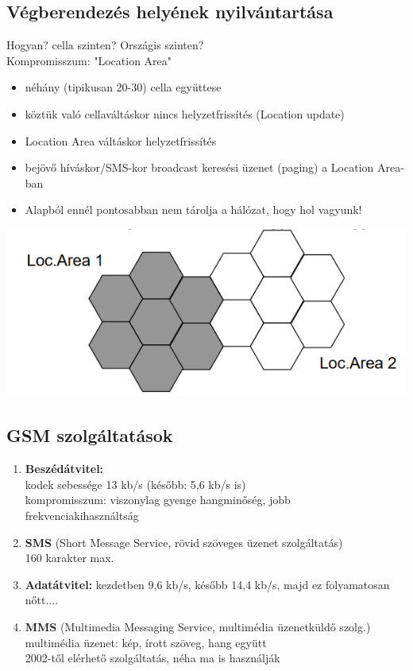 \documentclass[10pt,a4paper]{article}
\begin{document}
\subsection{Végberendezés helyének nyilvántartása}
Hogyan? cella szinten? Országis szinten?\\
Kompromisszum: "Location Area"\\
\begin{itemize}
	\item néhány (tipikusan 20-30) cella együttese
	\item köztük való cellaváltáskor nincs helyzetfrissítés (Location update)
	\item Location Area váltáskor helyzetfrissítés
	\item bejövő híváskor/SMS-kor broadcast keresési üzenet (paging) a Location
	Area-ban
	\item Alapból ennél pontosabban nem tárolja a hálózat, hogy hol vagyunk!
\end{itemize}
\begin{center}
	\includegraphics[width=0.5\linewidth]{src/LocArea}
\end{center}
\subsection{GSM szolgáltatások}
\begin{enumerate}
	\item  \textbf{Beszédátvitel: }
	\\kodek sebessége 13 kb/s (később: 5,6 kb/s is)
	\\ kompromisszum: viszonylag gyenge hangminőség, jobb
	frekvenciakihasználtság
	\item \textbf{SMS} (Short Message Service, rövid szöveges üzenet szolgáltatás)
	\\ 160 karakter max.
	\item \textbf{Adatátvitel:} kezdetben 9,6 kb/s, később 14,4 kb/s, majd ez folyamatosan nőtt....
	\item\textbf{MMS} (Multimedia Messaging Service, multimédia üzenetküldő szolg.)
	\\ multimédia üzenet: kép, írott szöveg, hang együtt
	\\ 2002-től elérhető szolgáltatás, néha ma is használják
\end{enumerate}
\end{document}

